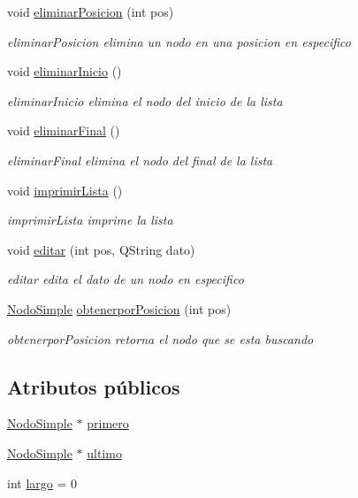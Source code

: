 \begin{DoxyCompactItemize}
void \mbox{\hyperlink{class_simple_linked_list_a260b6de5d5c73652fa016c3b63222bae}{eliminar\+Posicion}} (int pos)
\begin{DoxyCompactList}\small\item\em eliminar\+Posicion elimina un nodo en una posicion en especifico \end{DoxyCompactList}\item 
void \mbox{\hyperlink{class_simple_linked_list_a398074e6af83b72302153bef22e5a899}{eliminar\+Inicio}} ()
\begin{DoxyCompactList}\small\item\em eliminar\+Inicio elimina el nodo del inicio de la lista \end{DoxyCompactList}\item 
void \mbox{\hyperlink{class_simple_linked_list_aabf382c8f9262f7b23718f60c1ef724d}{eliminar\+Final}} ()
\begin{DoxyCompactList}\small\item\em eliminar\+Final elimina el nodo del final de la lista \end{DoxyCompactList}\item 
void \mbox{\hyperlink{class_simple_linked_list_a4ad22b92d55951e72e45dcf7f2867a5d}{imprimir\+Lista}} ()
\begin{DoxyCompactList}\small\item\em imprimir\+Lista imprime la lista \end{DoxyCompactList}\item 
void \mbox{\hyperlink{class_simple_linked_list_ac2d7b784c2c5b20824a4ab54ce20eaa7}{editar}} (int pos, Q\+String dato)
\begin{DoxyCompactList}\small\item\em editar edita el dato de un nodo en especifico \end{DoxyCompactList}\item 
\mbox{\hyperlink{class_nodo_simple}{Nodo\+Simple}} \mbox{\hyperlink{class_simple_linked_list_a443815291e245287229b5aca1d963faf}{obtenerpor\+Posicion}} (int pos)
\begin{DoxyCompactList}\small\item\em obtenerpor\+Posicion retorna el nodo que se esta buscando \end{DoxyCompactList}\end{DoxyCompactItemize}
\subsection*{Atributos públicos}
\begin{DoxyCompactItemize}
\item 
\mbox{\hyperlink{class_nodo_simple}{Nodo\+Simple}} $\ast$ \mbox{\hyperlink{class_simple_linked_list_a8bfa0f48fc7ace062a1220477f7e824b}{primero}}
\item 
\mbox{\hyperlink{class_nodo_simple}{Nodo\+Simple}} $\ast$ \mbox{\hyperlink{class_simple_linked_list_a2f2e30e2a9c1a8bfdf518bc28b6fcf0c}{ultimo}}
\item 
int \mbox{\hyperlink{class_simple_linked_list_acb900363f7077cdb4036bef55a16671d}{largo}} = 0
\end{DoxyCompactItemize}


